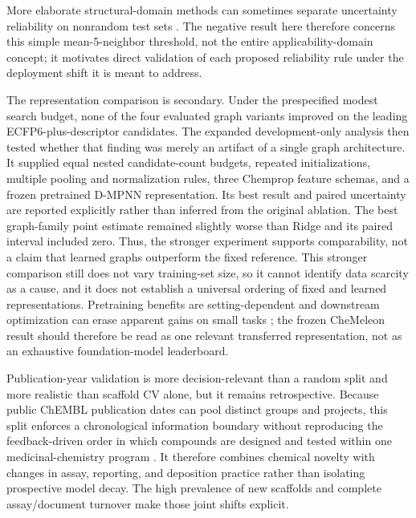 \documentclass[11pt]{article}
\begin{document}
More elaborate structural-domain methods can sometimes separate uncertainty
reliability on nonrandom test sets \citep{hosni2026explicit}. The negative result
here therefore concerns this simple mean-5-neighbor threshold, not the entire
applicability-domain concept; it motivates direct validation of each proposed
reliability rule under the deployment shift it is meant to address.

The representation comparison is secondary. Under the prespecified modest
search budget, none of the four evaluated graph variants improved on the leading
ECFP6-plus-descriptor candidates. The expanded development-only analysis then
tested whether that finding was merely an artifact of a single graph
architecture. It supplied equal nested candidate-count budgets, repeated initializations,
multiple pooling and normalization rules, three Chemprop feature schemas, and a
frozen pretrained D-MPNN representation. Its best result and paired uncertainty
are reported explicitly rather than inferred from the original ablation. The
best graph-family point estimate remained slightly worse than Ridge and its
paired interval included zero. Thus, the stronger experiment supports
comparability, not a claim that learned graphs outperform the fixed reference.
This
stronger comparison still does not vary training-set size, so it cannot identify
data scarcity as a cause, and it does not establish a universal ordering of
fixed and learned representations. Pretraining benefits are setting-dependent
and downstream optimization can erase apparent gains on small tasks
\citep{sun2022pretraining}; the frozen CheMeleon result should therefore be read
as one relevant transferred representation, not as an exhaustive
foundation-model leaderboard.

Publication-year validation is more decision-relevant than a random split and
more realistic than scaffold CV alone, but it remains retrospective. Because
public ChEMBL publication dates can pool distinct groups and projects, this split
enforces a chronological information boundary without reproducing the
feedback-driven order in which compounds are designed and tested within one
medicinal-chemistry program \citep{sheridan2013timesplit,landrum2023simpd}. It
therefore combines chemical novelty with changes in assay, reporting, and
deposition practice rather than isolating prospective model decay. The high
prevalence of new scaffolds and complete assay/document turnover make those
joint shifts explicit.
\end{document}
